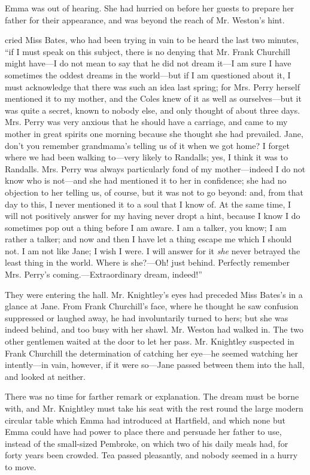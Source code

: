 Emma was out of hearing. She had hurried on before her guests to prepare her father for their appearance, and was beyond the reach of Mr. Weston's hint.

 cried Miss Bates, who had been trying in vain to be heard the last two minutes, “if I must speak on this subject, there is no denying that Mr. Frank Churchill might have---I do not mean to say that he did not dream it---I am sure I have sometimes the oddest dreams in the world---but if I am questioned about it, I must acknowledge that there was such an idea last spring; for Mrs. Perry herself mentioned it to my mother, and the Coles knew of it as well as ourselves---but it was quite a secret, known to nobody else, and only thought of about three days. Mrs. Perry was very anxious that he should have a carriage, and came to my mother in great spirits one morning because she thought she had prevailed. Jane, don't you remember grandmama's telling us of it when we got home? I forget where we had been walking to---very likely to Randalls; yes, I think it was to Randalls. Mrs. Perry was always particularly fond of my mother---indeed I do not know who is not---and she had mentioned it to her in confidence; she had no objection to her telling us, of course, but it was not to go beyond: and, from that day to this, I never mentioned it to a soul that I know of. At the same time, I will not positively answer for my having never dropt a hint, because I know I do sometimes pop out a thing before I am aware. I am a talker, you know; I am rather a talker; and now and then I have let a thing escape me which I should not. I am not like Jane; I wish I were. I will answer for it {\em she} never betrayed the least thing in the world. Where is she?---Oh! just behind. Perfectly remember Mrs. Perry's coming.---Extraordinary dream, indeed!”

They were entering the hall. Mr. Knightley's eyes had preceded Miss Bates's in a glance at Jane. From Frank Churchill's face, where he thought he saw confusion suppressed or laughed away, he had involuntarily turned to hers; but she was indeed behind, and too busy with her shawl. Mr. Weston had walked in. The two other gentlemen waited at the door to let her pass. Mr. Knightley suspected in Frank Churchill the determination of catching her eye---he seemed watching her intently---in vain, however, if it were so---Jane passed between them into the hall, and looked at neither.

There was no time for farther remark or explanation. The dream must be borne with, and Mr. Knightley must take his seat with the rest round the large modern circular table which Emma had introduced at Hartfield, and which none but Emma could have had power to place there and persuade her father to use, instead of the small-sized Pembroke, on which two of his daily meals had, for forty years been crowded. Tea passed pleasantly, and nobody seemed in a hurry to move.

